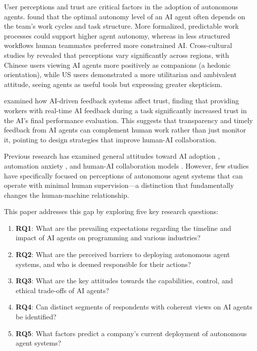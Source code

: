 \documentclass{article}
\providecommand{\tightlist}{%
  \setlength{\itemsep}{0pt}%
  \setlength{\parskip}{0pt}}
\begin{document}
User perceptions and trust are critical factors in the adoption of
autonomous agents. \cite{Hauptman2022} found that the optimal
autonomy level of an AI agent often depends on the team's work cycles
and task structure. More formalized, predictable work processes could
support higher agent autonomy, whereas in less structured workflows
human teammates preferred more constrained AI. Cross-cultural studies by
\cite{LiuCHI2024} revealed that perceptions vary significantly across
regions, with Chinese users viewing AI agents more positively as
companions (a hedonic orientation), while US users demonstrated a more
utilitarian and ambivalent attitude, seeing agents as useful tools but
expressing greater skepticism.

\cite{Brown2025} examined how AI-driven feedback systems affect
trust, finding that providing workers with real-time AI feedback during
a task significantly increased trust in the AI's final performance
evaluation. This suggests that transparency and timely feedback from AI
agents can complement human work rather than just monitor it, pointing
to design strategies that improve human-AI collaboration.

Previous research has examined general attitudes toward AI adoption
\citep{DavenportRonanki2018}, automation anxiety \citep{Frey2017}, and human-AI collaboration models \citep{Seeber2020}. However,
few studies have specifically focused on perceptions of autonomous agent systems that can operate with minimal human supervision---a distinction that fundamentally changes the human-machine relationship.

This paper addresses this gap by exploring five key research questions:

\begin{enumerate}
	\def\labelenumi{\arabic{enumi}.}
	\tightlist
	\item
	      \textbf{RQ1}: What are the prevailing expectations regarding the
	      timeline and impact of AI agents on programming and various
	      industries?
	\item
	      \textbf{RQ2}: What are the perceived barriers to deploying autonomous
	      agent systems, and who is deemed responsible for their actions?
	\item
	      \textbf{RQ3}: What are the key attitudes towards the capabilities,
	      control, and ethical trade-offs of AI agents?
	\item
	      \textbf{RQ4}: Can distinct segments of respondents with coherent views
	      on AI agents be identified?
	\item
	      \textbf{RQ5}: What factors predict a company's current deployment of
	      autonomous agent systems?
\end{enumerate}
\end{document}
